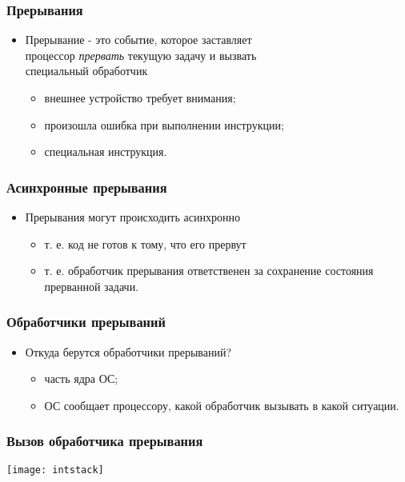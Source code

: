 \begin{frame}
\frametitle{Прерывания}
\begin{itemize}
    \item<1->Прерывание - это событие, которое заставляет \\
    процессор \emph{прервать} текущую задачу и вызвать \\
    специальный обработчик
    \begin{itemize}
        \item<2-> внешнее устройство требует внимания;
        \item<3-> произошла ошибка при выполнении инструкции;
        \item<4-> специальная инструкция.
    \end{itemize}
\end{itemize}
\end{frame}

\begin{frame}
\frametitle{Асинхронные прерывания}
\begin{itemize}
    \item<1->Прерывания могут происходить асинхронно
    \begin{itemize}
        \item<1->т. е. код не готов к тому, что его прервут
        \item<2->т. е. обработчик прерывания ответственен за
        сохранение состояния прерванной задачи.
    \end{itemize}
\end{itemize}
\end{frame}

\begin{frame}
\frametitle{Обработчики прерываний}
\begin{itemize}
    \item<1-> Откуда берутся обработчики прерываний?
    \begin{itemize}
        \item<2-> часть ядра ОС;
        \item<2-> ОС сообщает процессору, какой обработчик вызывать
        в какой ситуации.
    \end{itemize}
\end{itemize}
\end{frame}

\begin{frame}
\frametitle{Вызов обработчика прерывания}
    \hspace*{\fill}
    \texttt{[image: intstack]}
    \hspace*{\fill}\hspace*{\fill}
\end{frame}

